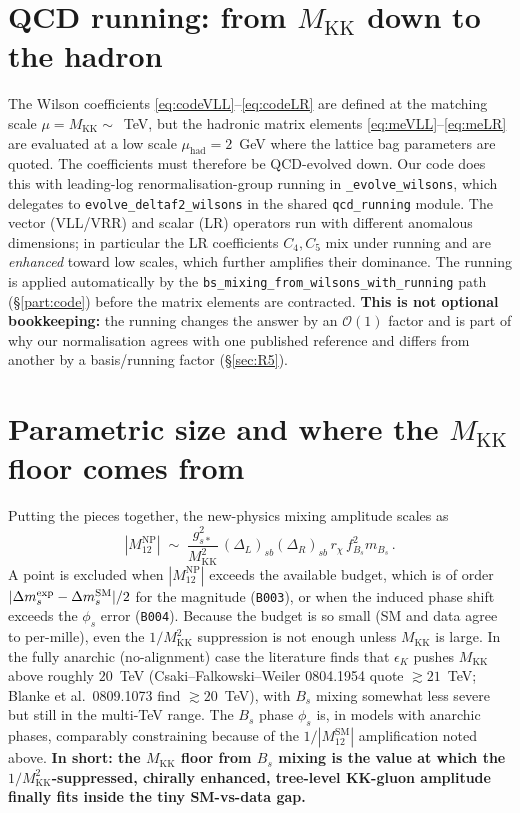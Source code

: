 \documentclass[11pt]{article}
\newcommand{\MKK}{M_{\mathrm{KK}}}
\newcommand{\code}[1]{\texttt{#1}}
\newcommand{\Bs}{B_s}
\newcommand{\dms}{\Delta m_s}
\newcommand{\phis}{\phi_s}
\newcommand{\MtwelveNP}{M_{12}^{\mathrm{NP}}}
\newcommand{\MtwelveSM}{M_{12}^{\mathrm{SM}}}
\newcommand{\muhad}{\mu_{\mathrm{had}}}
\theoremstyle{definition}
\begin{document}
\section{QCD running: from $\MKK$ down to the hadron}
\label{sec:running}

The Wilson coefficients \eqref{eq:codeVLL}--\eqref{eq:codeLR} are defined at the
matching scale $\mu=\MKK\sim$~TeV, but the hadronic matrix elements
\eqref{eq:meVLL}--\eqref{eq:meLR} are evaluated at a low scale $\muhad=2$~GeV
where the lattice bag parameters are quoted. The coefficients must therefore be
QCD-evolved down. Our code does this with leading-log renormalisation-group
running in \code{\_evolve\_wilsons}, which delegates to
\code{evolve\_deltaf2\_wilsons} in the shared \code{qcd\_running} module. The
vector (VLL/VRR) and scalar (LR) operators run with different anomalous
dimensions; in particular the LR coefficients $C_4,C_5$ mix under running and are
\emph{enhanced} toward low scales, which further amplifies their dominance. The
running is applied automatically by the
\code{bs\_mixing\_from\_wilsons\_with\_running} path (\S\ref{part:code}) before
the matrix elements are contracted. \textbf{This is not optional bookkeeping:}
the running changes the answer by an $\mathcal{O}(1)$ factor and is part of why
our normalisation agrees with one published reference and differs from another by
a basis/running factor (\S\ref{sec:R5}).

\section{Parametric size and where the $\MKK$ floor comes from}
\label{sec:floor}

Putting the pieces together, the new-physics mixing amplitude scales as
\begin{equation}
|\MtwelveNP| \;\sim\; \frac{g_{s*}^2}{\MKK^2}\,(\Delta_L)_{sb}(\Delta_R)_{sb}\,
r_\chi\, f_{\Bs}^2 m_{\Bs}\,.
\label{eq:M12scale}
\end{equation}
A point is excluded when $|\MtwelveNP|$ exceeds the available budget, which is of
order $|\dms^{\rm exp}-\dms^{\rm SM}|/2$ for the magnitude (\code{B003}), or when
the induced phase shift exceeds the $\phis$ error (\code{B004}). Because the
budget is so small (SM and data agree to per-mille), even the $1/\MKK^2$
suppression is not enough unless $\MKK$ is large. In the fully anarchic
(no-alignment) case the literature finds that $\epsilon_K$ pushes $\MKK$ above
roughly $20$~TeV (Csaki--Falkowski--Weiler 0804.1954 quote $\gtrsim 21$~TeV;
Blanke et al.\ 0809.1073 find $\gtrsim 20$~TeV), with $\Bs$ mixing somewhat less
severe but still in the multi-TeV range. The $\Bs$ phase $\phis$ is, in models
with anarchic phases, comparably constraining because of the $1/|\MtwelveSM|$
amplification noted above. \textbf{In short: the $\MKK$ floor from $\Bs$ mixing is
the value at which the $1/\MKK^2$-suppressed, chirally enhanced, tree-level
KK-gluon amplitude finally fits inside the tiny SM-vs-data gap.}
\end{document}
